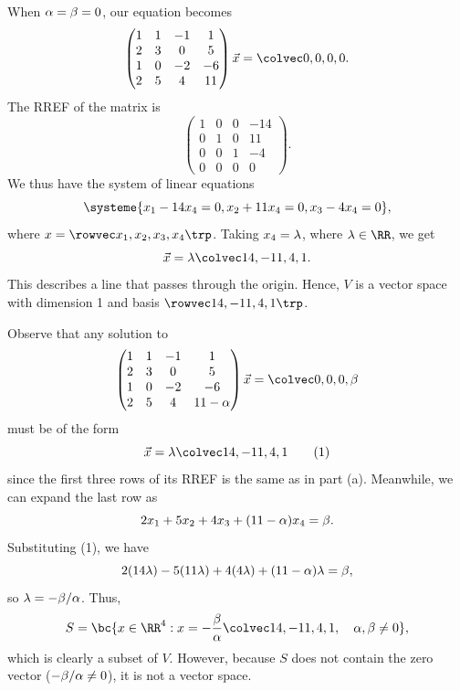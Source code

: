 \begin{solution}
    \begin{ppart}
        When $\alpha = \beta = 0$, our equation becomes \[\begin{pmatrix}1 & 1 & -1 & 1 \\ 2 & 3 & 0 & 5 \\ 1 & 0 & -2 & -6 \\ 2 & 5 & 4 & 11\end{pmatrix} \vec x = \cveciv0000.\] The RREF of the matrix is \[\begin{pmatrix}1 & 0 & 0 & -14 \\ 0 & 1 & 0 & 11 \\ 0 & 0 & 1 & -4 \\ 0 & 0 & 0 & 0\end{pmatrix}.\] We thus have the system of linear equations \[\systeme{x_1 - 14x_4 = 0, x_2 + 11x_4 = 0, x_3 - 4x_4 = 0},\] where $x = \cvecivx{x_1}{x_2}{x_3}{x_4}$. Taking $x_4 = \lambda$, where $\l \in \RR$, we get \[\vec x = \l \cveciv{14}{-11}{4}{1}.\] This describes a line that passes through the origin. Hence, $V$ is a vector space with dimension 1 and basis $\cvecivx{14}{-11}{4}{1}$.
    \end{ppart}
    \begin{ppart}
        Observe that any solution to \[\begin{pmatrix}1 & 1 & -1 & 1 \\ 2 & 3 & 0 & 5 \\ 1 & 0 & -2 & -6 \\ 2 & 5 & 4 & 11 - \a\end{pmatrix} \vec x = \cveciv000\b\] must be of the form \[\vec x = \l \cveciv{14}{-11}{4}{1} \tag{1}\] since the first three rows of its RREF is the same as in part (a). Meanwhile, we can expand the last row as \[2x_1 + 5x_2 + 4x_3 + (11 - \alpha) x_4 = \beta.\] Substituting (1), we have \[2 (14 \lambda) - 5 (11 \lambda) + 4 (4 \lambda) + (11 - \alpha) \lambda = \beta,\] so $\lambda = -\beta/\alpha$. Thus, \[S = \bc{x \in \RR^4 : x = -\frac{\b}{\a} \cveciv{14}{-11}{4}{1}, \quad \a, \b \neq 0},\] which is clearly a subset of $V$. However, because $S$ does not contain the zero vector ($-\beta/\alpha \neq 0$), it is not a vector space.
    \end{ppart}
\end{solution}

